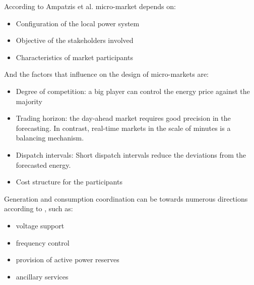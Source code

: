 \documentclass[a4paper,11pt,twoside,openright]{report}
\begin{document}

According to Ampatzis et al. \cite{ampatzis2014} micro-market depends on:
\begin{itemize}
	\item Configuration of the local power system
	\item Objective of the stakeholders involved
	\item Characteristics of market participants
\end{itemize}

And the factors that influence on the design of micro-markets are:
\begin{itemize}
	\item Degree of competition: a big player can control the energy price against the majority
	\item Trading horizon: the day-ahead market requires good precision in the forecasting. In contrast, real-time markets in the scale of minutes is a balancing mechanism.
	\item Dispatch intervals: Short dispatch intervals reduce the deviations from the forecasted energy.
	\item Cost structure for the participants
\end{itemize}

Generation and consumption coordination can be towards numerous directions according to \cite{ampatzis2014}, such as:
\begin{itemize}
	\item voltage support
	\item frequency control
	\item provision of active power reserves
	\item ancillary services
\end{itemize}
\end{document}
